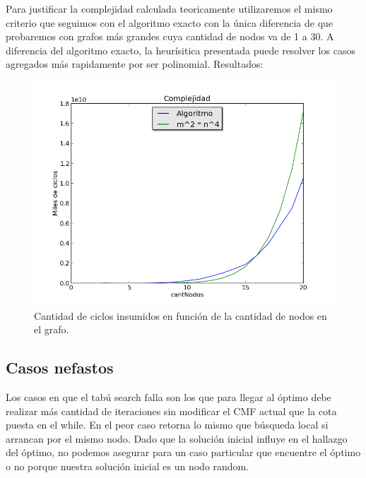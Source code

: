 Para justificar la complejidad calculada teoricamente utilizaremos el mismo criterio que seguimos con el algoritmo exacto con la única diferencia de que probaremos con grafos más grandes cuya cantidad de nodos va de 1 a 30. A diferencia del algoritmo exacto, la heurísitica presentada puede resolver los casos agregados más rapidamente por ser polinomial. Resultados:

\begin{figure}[H]
\centering\includegraphics[width=12 cm]{tabu/complejidad.png}
\caption{Cantidad de ciclos insumidos en función de la cantidad de nodos en el grafo.}
\end{figure}

\subsection{Casos nefastos}
Los casos en que el tabú search falla son los que para llegar al óptimo debe realizar más cantidad de iteraciones sin modificar el CMF actual que la cota puesta en el while. En el peor caso retorna lo mismo que búsqueda local si arrancan por el mismo nodo. Dado que la solución inicial influye en el hallazgo del óptimo, no podemos asegurar para un caso particular que encuentre el óptimo o no porque nuestra solución inicial es un nodo random.






